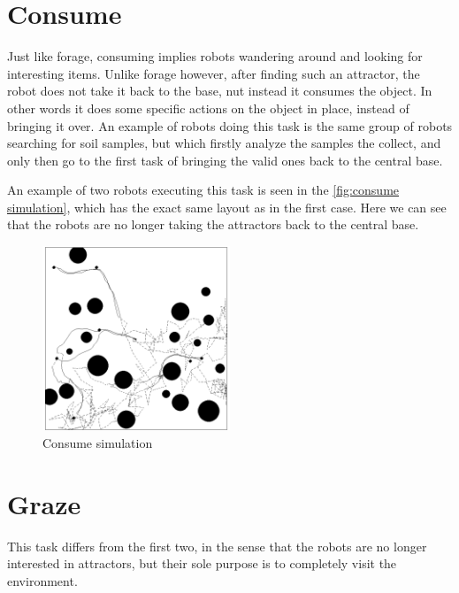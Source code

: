 \documentclass[12pt]{report}
\begin{document}
\section{Consume}

Just like forage, consuming implies robots wandering around and looking for interesting items. Unlike forage however, after finding such an attractor, the robot does not take it back to the base, nut instead it consumes the object. In other words it does some specific actions on the object in place, instead of bringing it over. An example of robots doing this  task is the same group of robots searching for soil samples, but which firstly analyze the samples the collect,
and only then go to the first task of bringing the valid ones back to the central base.

An example of two robots executing this task is seen in the \autoref{fig:consume simulation}, which has the exact same layout as in the first case. Here we can see that the robots are no longer taking the attractors back to the central base.



\begin{figure}[h]
\centering
\includegraphics[width=0.5\textwidth]{"2 consume simulation"}
\caption{Consume simulation}
\label{fig:consume simulation}
\end{figure}







\section{Graze}

This task differs from the first two, in the sense that the robots are no longer interested in attractors, but their sole purpose is to completely visit the environment.
\end{document}
